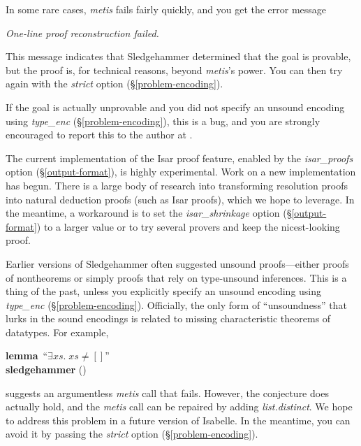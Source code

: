 \documentclass[a4paper,12pt]{article}
\begin{document}
In some rare cases, \textit{metis} fails fairly quickly, and you get the error
message

\prew
\slshape
One-line proof reconstruction failed.
\postw

This message indicates that Sledgehammer determined that the goal is provable,
but the proof is, for technical reasons, beyond \textit{metis}'s power. You can
then try again with the \textit{strict} option (\S\ref{problem-encoding}).

If the goal is actually unprovable and you did not specify an unsound encoding
using \textit{type\_enc} (\S\ref{problem-encoding}), this is a bug, and you are
strongly encouraged to report this to the author at \authoremail.


The current implementation of the Isar proof feature,
enabled by the \textit{isar\_proofs} option (\S\ref{output-format}),
is highly experimental. Work on a new implementation has begun. There is a large body of
research into transforming resolution proofs into natural deduction proofs (such
as Isar proofs), which we hope to leverage. In the meantime, a workaround is to
set the \textit{isar\_shrinkage} option (\S\ref{output-format}) to a larger
value or to try several provers and keep the nicest-looking proof.


Earlier versions of Sledgehammer often suggested unsound proofs---either proofs
of nontheorems or simply proofs that rely on type-unsound inferences. This
is a thing of the past, unless you explicitly specify an unsound encoding
using \textit{type\_enc} (\S\ref{problem-encoding}).
%
Officially, the only form of ``unsoundness'' that lurks in the sound
encodings is related to missing characteristic theorems of datatypes. For
example,

\prew
\textbf{lemma}~``$\exists \mathit{xs}.\; \mathit{xs} \neq []$'' \\
\textbf{sledgehammer} ()
\postw

suggests an argumentless \textit{metis} call that fails. However, the conjecture
does actually hold, and the \textit{metis} call can be repaired by adding
\textit{list.distinct}.
%
We hope to address this problem in a future version of Isabelle. In the
meantime, you can avoid it by passing the \textit{strict} option
(\S\ref{problem-encoding}).

\end{document}
